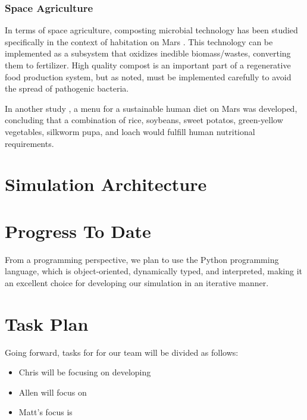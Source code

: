 \documentclass[12pt]{article}
\begin{document}
\subsubsection{Space Agriculture}

In terms of space agriculture, composting microbial technology has been studied
specifically in the context of habitation on Mars \cite{kanazawa2008space}.
This technology can be implemented as a subsystem that oxidizes inedible
biomass/wastes, converting them to fertilizer. High quality compost is an
important part of a regenerative food production system, but as noted, must
be implemented carefully to avoid the spread of pathogenic bacteria.

In another study \cite{katayama2005entomophagy}, a menu for a sustainable human
diet on Mars was developed, concluding that a combination of rice, soybeans,
sweet potatos, green-yellow vegetables, silkworm pupa, and loach would fulfill
human nutritional requirements.

\section{Simulation Architecture}
\label{sec:architecture}

\section{Progress To Date}
\label{sec:progress}

From a programming perspective, we plan to use the Python programming language,
which is object-oriented, dynamically typed, and interpreted, making it an
excellent choice for developing our simulation in an iterative manner.

\section{Task Plan}
\label{sec:taskplan}

Going forward, tasks for for our team will be divided as follows:

\begin{itemize}
  \item Chris will be focusing on developing
  \item Allen will focus on
  \item Matt's focus is 
\end{itemize}

\clearpage
{}

\end{document}

